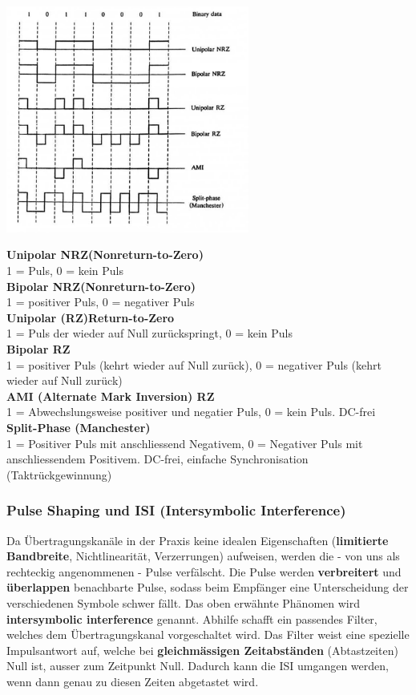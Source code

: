\begin{minipage}{9cm}
	\includegraphics[width=8cm]{bilder/dig_leitungscodierung.png}
\end{minipage}
\begin{minipage}{9cm}
	\textbf{Unipolar NRZ(Nonreturn-to-Zero)} \\
	1 = Puls, 0 = kein Puls \\[0.2cm]
	\textbf{Bipolar NRZ(Nonreturn-to-Zero)} \\
	1 = positiver Puls, 0 = negativer Puls \\[0.2cm]
	\textbf{Unipolar (RZ)Return-to-Zero} \\
	1 = Puls der wieder auf Null zurückspringt, 0 = kein Puls \\[0.2cm]
	\textbf{Bipolar RZ} \\
	1 = positiver Puls (kehrt wieder auf Null zurück), 0 = negativer Puls (kehrt wieder auf Null
	zurück)\\[0.2cm]
	\textbf{AMI (Alternate Mark Inversion) RZ} \\
	1 = Abwechslungsweise positiver und negatier Puls, 0 = kein Puls. DC-frei\\[0.2cm]
	\textbf{Split-Phase (Manchester)} \\
	1 = Positiver Puls mit anschliessend Negativem, 0 = Negativer Puls mit anschliessendem Positivem. DC-frei, einfache Synchronisation (Taktr\"uckgewinnung)
\end{minipage}


\subsubsection{Pulse Shaping und ISI (Intersymbolic Interference) }
Da Übertragungskanäle in der Praxis keine idealen Eigenschaften 
(\textbf{limitierte Bandbreite}, Nichtlinearität, Verzerrungen) aufweisen,
werden die - von uns als rechteckig
angenommenen - Pulse verfälscht. Die Pulse werden \textbf{verbreitert} und \textbf{überlappen}
benachbarte Pulse, sodass beim Empfänger eine Unterscheidung der verschiedenen Symbole schwer
fällt. 
Das oben erwähnte Phänomen wird \textbf{intersymbolic interference} genannt.
Abhilfe schafft ein passendes Filter, welches dem Übertragungskanal vorgeschaltet wird. Das Filter
weist eine spezielle Impulsantwort auf, welche bei \textbf{gleichmässigen Zeitabständen}
(Abtastzeiten) Null ist, ausser zum Zeitpunkt Null. Dadurch kann die ISI umgangen werden, wenn dann
genau zu diesen Zeiten abgetastet wird. \\ 

